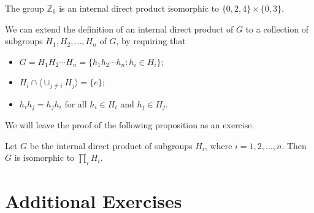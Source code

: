  
\begin{example}\label{example:isomorph:Z6_product}
The group ${\mathbb Z}_6$ is an internal direct product isomorphic to $\{
0, 2, 4\} \times \{ 0, 3 \}$. 
\end{example}

 
We can extend the definition of an internal direct product of $G$ to a
collection of subgroups $H_1, H_2, \ldots, H_n$ of $G$, by requiring
that 
\begin{itemize}
 
\item
$G = H_1 H_2 \cdots H_n = \{ h_1 h_2 \cdots h_n : h_i \in H_i \}$;
 
\item
$H_i \cap \langle \cup_{j \neq i} H_j \rangle = \{ e \}$;
 
\item
$h_i h_j = h_j h_i$ for all $h_i \in H_i$ and $h_j \in H_j$.
 
\end{itemize}
We will leave the proof of the following proposition as an exercise. 
 
\begin{thm}
Let $G$ be the internal direct product of subgroups $H_i$, where $i =
1, 2, \ldots, n$. Then $G$ is isomorphic to $\prod_i H_i$. 
\end{thm}

 


 
\section*{Additional Exercises}
\exrule

 
 
